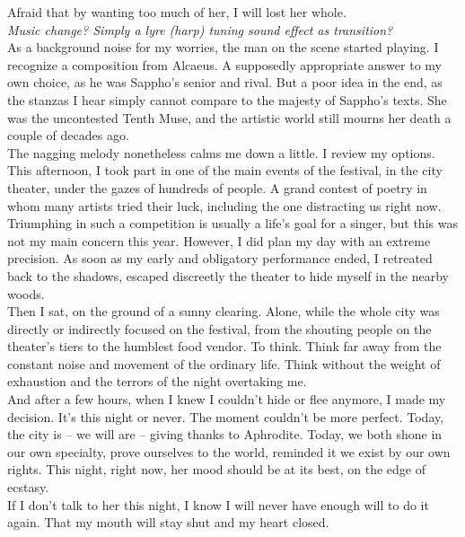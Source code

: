 \documentclass{report}
\newcommand{\dcomment}[1]{
	\emph{#1}
	\\
}
\begin{document}
Afraid that by wanting too much of her, I will lost her whole.\\

\dcomment{
	Music change? Simply a lyre (harp) tuning sound effect as transition?
}

As a background noise for my worries, the man on the scene started playing. I recognize a composition from Alcaeus. A supposedly appropriate answer to my own choice, as he was Sappho's senior and rival. But a poor idea in the end, as the stanzas I hear simply cannot compare to the majesty of Sappho's texts. She was the uncontested Tenth Muse, and the artistic world still mourns her death a couple of decades ago.\\

The nagging melody nonetheless calms me down a little. I review my options. This afternoon, I took part in one of the main events of the festival, in the city theater, under the gazes of hundreds of people. A grand contest of poetry in whom many artists tried their luck, including the one distracting us right now.\\

Triumphing in such a competition is usually a life's goal for a singer, but this was not my main concern this year. However, I did plan my day with an extreme precision. As soon as my early and obligatory performance ended, I retreated back to the shadows, escaped discreetly the theater to hide myself in the nearby woods.\\

Then I sat, on the ground of a sunny clearing. Alone, while the whole city was directly or indirectly focused on the festival, from the shouting people on the theater's tiers to the humblest food vendor. To think. Think far away from the constant noise and movement of the ordinary life. Think without the weight of exhaustion and the terrors of the night overtaking me.\\

And after a few hours, when I knew I couldn't hide or flee anymore, I made my decision. It's this night or never. The moment couldn't be more perfect. Today, the city is – we will are – giving thanks to Aphrodite. Today, we both shone in our own specialty, prove ourselves to the world, reminded it we exist by our own rights. This night, right now, her mood should be at its best, on the edge of ecstasy.\\

If I don't talk to her this night, I know I will never have enough will to do it again. That my mouth will stay shut and my heart closed.\\
\end{document}
